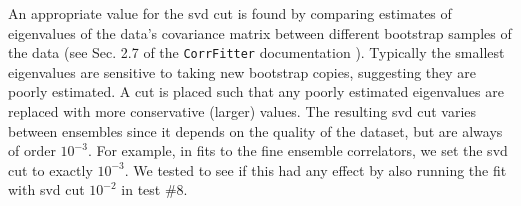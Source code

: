 An appropriate value for the svd cut is found by comparing estimates of eigenvalues of the data's covariance matrix between different bootstrap samples of the data (see Sec. 2.7 of the \texttt{CorrFitter} documentation \cite{CorrFitter}). Typically the smallest eigenvalues are sensitive to taking new bootstrap copies, suggesting they are poorly estimated. A cut is placed such that any poorly estimated eigenvalues are replaced with more conservative (larger) values. The resulting svd cut varies between ensembles since it depends on the quality of the dataset, but are always of order $10^{-3}$.
For example, in fits to the fine ensemble correlators, we set the svd cut to exactly $10^{-3}$. We tested to see if this had any effect by also running the fit with svd cut $10^{-2}$ in test \#8.


